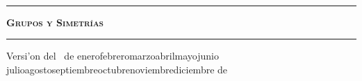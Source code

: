 \documentclass[letterpaper,11pt]{report}
\def\today{\number\day~de\space\ifcase\month\or
 enero\or febrero\or marzo\or abril\or mayo\or junio\or
 julio\or agosto\or septiembre\or octubre\or noviembre\or diciembre\fi
 \space de~\number\year}
\begin{document}
\thispagestyle{empty}
\begin{center}

\

\vspace{6.5cm}

\rule{15cm}{0.1cm}

\vspace{1.5cm}

{\huge \textsc{\textbf{Grupos y Simetr\'ias}}}

\vspace{1.5cm}

\rule{15cm}{0.1cm}
\vspace{1.5cm}

Versi'on del \today

\end{center}


\newpage
\thispagestyle{empty}
\ \\
\newpage


\tableofcontents
{}
\setcounter{page}{1}






\end{document}
